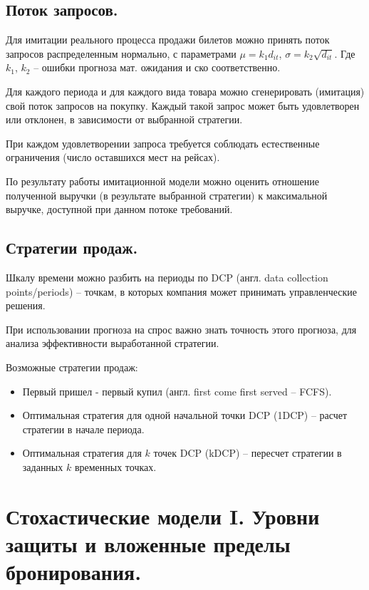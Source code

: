 \documentclass[12pt, reqno]{article}
\theoremstyle{definition}
\theoremstyle{definition}
\theoremstyle{definition}
\theoremstyle{definition}
\theoremstyle{definition}
\theoremstyle{definition}
\theoremstyle{definition}
\theoremstyle{definition}
\theoremstyle{definition}
\begin{document}
		
		\subsection{Поток запросов.}
		
		
		Для имитации реального процесса продажи билетов можно принять поток запросов распределенным нормально, с параметрами $\mu = k_1 d_{i t}$, $\sigma = k_2 \sqrt{d_{i t}}$. Где $k_1$, $k_2$ -- ошибки прогноза мат. ожидания и ско соответственно.
		
		Для каждого периода и для каждого вида товара можно сгенерировать (имитация) свой поток запросов на покупку. Каждый такой запрос может быть удовлетворен или отклонен, в зависимости от выбранной стратегии.
		
		При каждом удовлетворении запроса требуется соблюдать естественные ограничения (число оставшихся мест на рейсах).
		
		По результату работы имитационной модели можно оценить отношение полученной выручки (в результате выбранной стратегии) к максимальной выручке, доступной при данном потоке требований.
		
		
		\subsection{Стратегии продаж.}
		
		Шкалу времени можно разбить на периоды по DCP (англ. data collection points/periods) -- точкам, в которых компания может принимать управленческие решения.
		
		При использовании прогноза на спрос важно знать точность этого прогноза, для анализа эффективности выработанной стратегии.
		
		Возможные стратегии продаж:
		\begin{itemize}
			\item Первый пришел - первый купил (англ. first come first served -- FCFS).
			\item Оптимальная стратегия для одной начальной точки DCP (1DCP) -- расчет стратегии в начале периода.
			\item Оптимальная стратегия для $k$ точек DCP (kDCP) -- пересчет стратегии в заданных $k$ временных точках.
		\end{itemize}
	
			
		
		
		\newpage
		\section{Стохастические модели I. Уровни защиты и вложенные пределы бронирования.}
		
\end{document}
